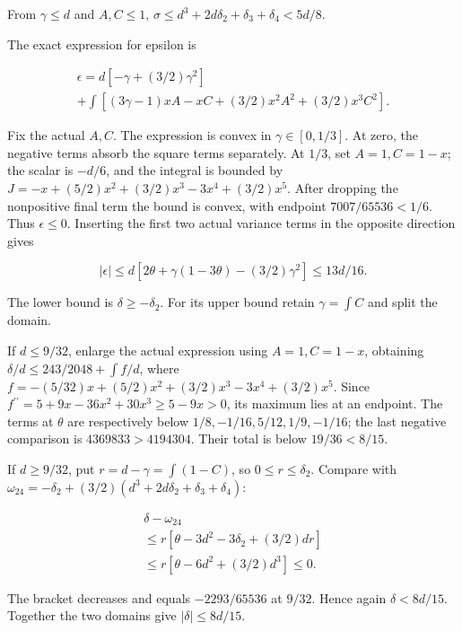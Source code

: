 From \(\gamma\le d\) and \(A,\allowbreak \allowbreak  C\le1\), \(\sigma\le d^3+2d\delta_2+\delta_3+\delta_4<5d/8\).

The exact expression for epsilon is

\[
\begin{gathered}
\epsilon=d[-\gamma+(3/2)\gamma^2]\\
+\int[(3\gamma-1)xA-xC+(3/2)x^2A^2+(3/2)x^3C^2].
\end{gathered}
\]

Fix the actual \(A,\allowbreak \allowbreak  C\). The expression is convex in \(\gamma\in[0,\allowbreak \allowbreak  1/3]\). At zero, the negative terms absorb the square terms separately. At \(1/3\), set \(A=1,\allowbreak \allowbreak  C=1-x\); the scalar is \(-d/6\), and the integral is bounded by \(J=-x+(5/2)x^2+(3/2)x^3-3x^4+(3/2)x^5\). After dropping the nonpositive final term the bound is convex, with endpoint \(7007/65536<1/6\). Thus \(\epsilon\le0\). Inserting the first two actual variance terms in the opposite direction gives

\[
|\epsilon|\le d[2\theta+\gamma(1-3\theta)-(3/2)\gamma^2]
\le13d/16.
\]

The lower bound is \(\delta\ge-\delta_2\). For its upper bound retain \(\gamma=\int C\) and split the domain.

If \(d\le9/32\), enlarge the actual expression using \(A=1,\allowbreak \allowbreak  C=1-x\), obtaining \(\delta/d\le243/2048+\int f/d\), where \(f=-(5/32)x+(5/2)x^2+(3/2)x^3-3x^4+(3/2)x^5\). Since \(f\!\!{}^{\prime\prime}=5+9x-36x^2+30x^3\ge5-9x>0\), its maximum lies at an endpoint. The terms at \(\theta\) are respectively below \(1/8,\allowbreak \allowbreak -1/16,\allowbreak \allowbreak  5/12,\allowbreak \allowbreak  1/9,\allowbreak \allowbreak -1/16\); the last negative comparison is \(4369833>4194304\). Their total is below \(19/36<8/15\).

If \(d\ge9/32\), put \(r=d-\gamma=\int(1-C)\), so \(0\le r\le \delta_2\). Compare with \(\omega_{24}=-\delta_2+(3/2)(d^3+2d\delta_2+\delta_3+\delta_4)\):

\[
\begin{gathered}
\delta-\omega_{24}\\
\le r[\theta-3d^2-3\delta_2+(3/2)dr]\\
\le r[\theta-6d^2+(3/2)d^3]\le0.
\end{gathered}
\]

The bracket decreases and equals \(-2293/65536\) at \(9/32\). Hence again \(\delta<8d/15\). Together the two domains give \(|\delta|\le8d/15\).

